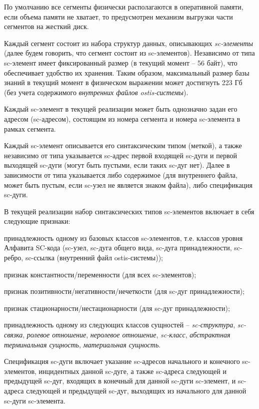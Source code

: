 \begin{SCn}
{По умолчанию все сегменты физически располагаются в оперативной памяти, если объема памяти не хватает, то предусмотрен механизм выгрузки части сегментов на жесткий диск.

Каждый сегмент состоит из набора структур данных, описывающих \textit{sc-элементы} (далее будем говорить, что сегмент состоит из sc-элементов). Независимо от типа sc-элемент имеет фиксированный размер (в текущий момент -- 56 байт), что обеспечивает удобство их хранения. Таким образом, максимальный размер базы знаний в текущий момент в физическом выражении может достигнуть 223 Гб (без учета содержимого \textit{внутренних файлов ostis-системы}).

Каждый sc-элемент в текущей реализации может быть однозначно задан его адресом (sc-адресом), состоящим из номера сегмента и номера sc-элемента в рамках сегмента.

Каждый sc-элемент описывается его синтаксическим типом (меткой), а также независимо от типа указывается sc-адрес первой входящей sc-дуги и первой выходящей sc-дуги (могут быть пустыми, если таких sc-дуг нет). Далее в зависимости от типа указывается либо содержимое (для внутреннего файла, может быть пустым, если sc-узел не является знаком файла), либо спецификация sc-дуги.

В текущей реализации набор синтаксических типов sc-элементов  включает в себя следующие признаки:
\begin{scnitemize}
	\item принадлежность одному из базовых классов sc-элементов, т.е. классов уровня Алфавита SC-кода (sc-узел, sc-дуга общего вида, sc-дуга принадлежности, sc-ребро, sc-ссылка (внутренний файл ostis-системы));
	\item признак константности/переменности (для всех sc-элементов);
	\item признак позитивности/негативности/нечеткости (для sc-дуг принадлежности);
	\item признак стационарности/нестационарности (для sc-дуг принадлежности);	
	\item принадлежность одному из следующих классов сущностей -- \textit{sc-структура}, \textit{sc-связка}, \textit{ролевое отношение}, \textit{неролевое отношение}, \textit{sc-класс}, \textit{абстрактная терминальная сущность}, \textit{материальная сущность}.
\end{scnitemize}

Спецификация sc-дуги включает указание sc-адресов начального и конечного sc-элементов, инцидентных данной sc-дуге, а также sc-адреса следующей и предыдущей sc-дуг, входящих в конечный для данной sc-дуги sc-элемент, и sc-адреса следующей и предыдущей sc-дуг, выходящих из начального для данной sc-дуги sc-элемента. 

}
\end{SCn}
